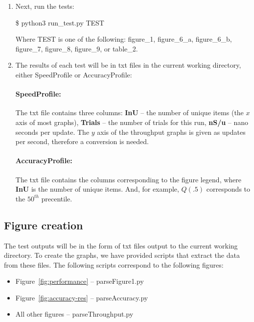 {\begin{enumerate}
  \item Next, run the tests:

  \begin{framed}

  \$ python3 run\_test.py TEST

  \end{framed}

  \noindent Where TEST is one of the following: figure\_1, figure\_6\_a, figure\_6\_b, figure\_7, figure\_8, figure\_9, or table\_2.


  \item \label{n:run-test} The results of each test will be in txt files in the current working directory, either SpeedProfile or AccuracyProfile:
  \paragraph{\textbf{SpeedProfile:}} The txt file contains three columns: \textbf{InU} -- the number of unique items (the $x$
  axis of most graphs), \textbf{Trials} -- the number of trials for this run, \textbf{nS/u} -- nano seconds per update. The $y$
  axis of the throughput graphs is given as updates per second, therefore a conversion is needed.
  \paragraph{\textbf{AccuracyProfile:}} The txt file contains the columns corresponding to the figure legend, where
  \textbf{InU} is the number of unique items. And, for example, $Q(.5)$ corresponds to the $50^{th}$ precentile.

\end{enumerate}


\subsection{Figure creation}

The test outputs will be in the form of txt files output to the current working directory. To create the graphs, we
have provided scripts that extract the data from these files.
The following scripts correspond to the following figures:
\begin{itemize}
  \item Figure~\ref{fig:performance} -- parseFigure1.py
  \item Figure~\ref{fig:accuracy-res} -- parseAccuracy.py
  \item All other figures -- parseThroughput.py
\end{itemize}

}
